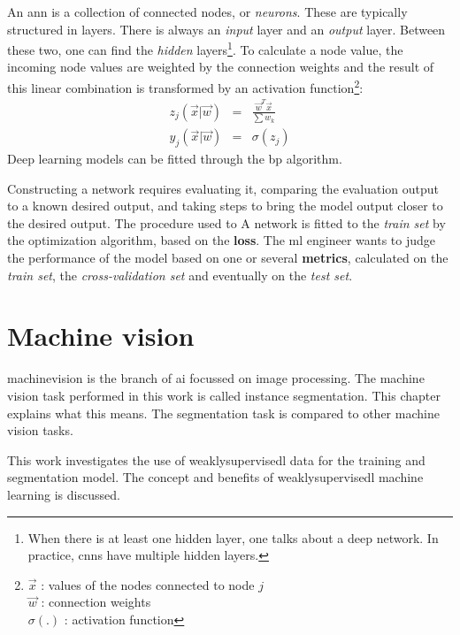 An \acrshort{ann} is a collection of connected nodes, or \textit{neurons}. 
These are typically structured in layers. 
There is always an \textit{input} layer and an \textit{output} layer. Between these two, one can find the \textit{hidden} layers\footnote{When there is at least one hidden layer, one talks about a deep network. In practice, \acrshort{cnn}s have multiple hidden layers.}.
To calculate a node value, the incoming node values are weighted by the connection weights and the result of this linear combination is transformed by an activation function\footnote{
    $\vec{x}$ : values of the nodes connected to node $j$\\
    $\vec{w}$ : connection weights\\
    $\sigma(.)$ : activation function
}:
\begin{eqnarray}
    z_j(\vec{x} | \vec{w}) &=& \frac{\vec{w}^T\vec{x}}{\sum w_k} \\
    y_j(\vec{x} | \vec{w}) &=& \sigma(z_j)
\end{eqnarray}
Deep learning models can be fitted through the \acrfull{bp} algorithm.


Constructing a network requires evaluating it, comparing the evaluation output to a known desired output, and taking steps to bring the model output closer to the desired output. 
The procedure used to 
A network is fitted to the \textit{train set} by the optimization algorithm, based on the \textbf{loss}.
The \acrshort{ml} engineer wants to judge the performance of the model based on one or several \textbf{metrics}, calculated on the \textit{train set}, the \textit{cross-validation set} and eventually on the \textit{test set}.

\section{Machine vision}

\Gls{machinevision} is the branch of \Gls{ai} focussed on image processing.
The machine vision task performed in this work is called instance \Gls{segmentation}.
This chapter explains what this means. 
The segmentation task is compared to other machine vision tasks.

This work investigates the use of \Gls{weaklysupervisedl} data for the training and segmentation model. 
The concept and benefits of \Gls{weaklysupervisedl} machine learning is discussed.

